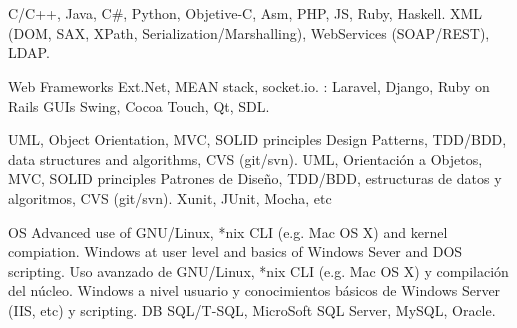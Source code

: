 \section{}


\cvcomputer
    {}
        {C/C++, Java, C\#, Python, Objetive-C, Asm, PHP, JS, Ruby, Haskell.}
    {}
        {XML (DOM, SAX, XPath, Serialization/Marshalling), WebServices
        (SOAP/REST), LDAP.}

\cvcomputer
    {Web Frameworks}
        {Ext.Net, MEAN stack, socket.io. : Laravel,
        Django, Ruby on Rails}
	{GUIs}
        {Swing, Cocoa Touch, Qt, SDL.}


\cvcomputer
    {}
        {\ml
            {UML, Object Orientation, MVC, SOLID principles Design Patterns,
            TDD/BDD, data structures and algorithms, CVS (git/svn).}
            {UML, Orientación a Objetos, MVC, SOLID principles Patrones de
            Diseño, TDD/BDD, estructuras de datos y algoritmos, CVS (git/svn).}
        }
    {}
        {Xunit, JUnit, Mocha, etc}



\cvcomputer
    {OS}
        {\ml
            {Advanced use of GNU/Linux, *nix CLI (e.g. Mac OS X) and kernel
            compiation. Windows at user level and basics of Windows Sever and
            DOS scripting.}
            {Uso avanzado de GNU/Linux, *nix CLI (e.g. Mac OS X) y compilación
            del núcleo. Windows a nivel usuario y conocimientos básicos de
            Windows Server (IIS, etc) y scripting.}
        }
    {DB}
        {SQL/T-SQL, MicroSoft SQL Server, MySQL, Oracle.}

